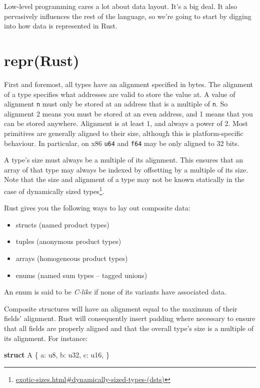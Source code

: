 \documentclass[a4paper,]{book}
\newenvironment{Shaded}{\begin{snugshade}}{\end{snugshade}}
\newcommand{\KeywordTok}[1]{\textcolor[rgb]{0.13,0.29,0.53}{\textbf{{#1}}}}
\newcommand{\DataTypeTok}[1]{\textcolor[rgb]{0.13,0.29,0.53}{{#1}}}
\newcommand{\NormalTok}[1]{{#1}}
\renewcommand{\href}[2]{#2\footnote{\url{#1}}}
\providecommand{\tightlist}{%
  \setlength{\itemsep}{0pt}\setlength{\parskip}{0pt}}
\begin{document}
Low-level programming cares a lot about data layout. It's a big deal. It
also pervasively influences the rest of the language, so we're going to
start by digging into how data is represented in Rust.

\section{repr(Rust)}\label{sec--repr-rust}

First and foremost, all types have an alignment specified in bytes. The
alignment of a type specifies what addresses are valid to store the
value at. A value of alignment \texttt{n} must only be stored at an
address that is a multiple of \texttt{n}. So alignment 2 means you must
be stored at an even address, and 1 means that you can be stored
anywhere. Alignment is at least 1, and always a power of 2. Most
primitives are generally aligned to their size, although this is
platform-specific behaviour. In particular, on x86 \texttt{u64} and
\texttt{f64} may be only aligned to 32 bits.

A type's size must always be a multiple of its alignment. This ensures
that an array of that type may always be indexed by offsetting by a
multiple of its size. Note that the size and alignment of a type may not
be known statically in the case of
\href{exotic-sizes.html\#dynamically-sized-types-(dsts)}{dynamically
sized types}.

Rust gives you the following ways to lay out composite data:

\begin{itemize}
\tightlist
\item
  structs (named product types)
\item
  tuples (anonymous product types)
\item
  arrays (homogeneous product types)
\item
  enums (named sum types -- tagged unions)
\end{itemize}

An enum is said to be \emph{C-like} if none of its variants have
associated data.

Composite structures will have an alignment equal to the maximum of
their fields' alignment. Rust will consequently insert padding where
necessary to ensure that all fields are properly aligned and that the
overall type's size is a multiple of its alignment. For instance:

\begin{Shaded}
\begin{Highlighting}[]
\KeywordTok{struct} \NormalTok{A \{}
    \NormalTok{a: }\DataTypeTok{u8}\NormalTok{,}
    \NormalTok{b: }\DataTypeTok{u32}\NormalTok{,}
    \NormalTok{c: }\DataTypeTok{u16}\NormalTok{,}
\NormalTok{\}}
\end{Highlighting}
\end{Shaded}
\end{document}
